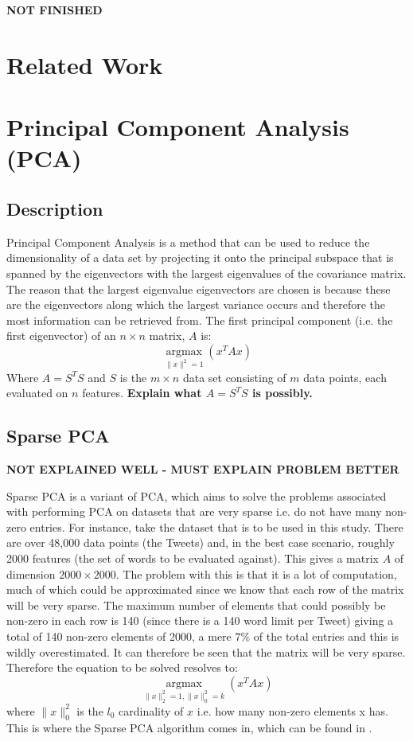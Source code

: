 \documentclass[11pt,a4paper]{article}
\begin{document}
\textbf{NOT FINISHED}

\section{Related Work}
\section{Principal Component Analysis (PCA)}
\subsection{Description}
Principal Component Analysis is a method that can be used to reduce the dimensionality of a data set by projecting it onto the principal subspace that is spanned by the eigenvectors with the largest eigenvalues of the covariance matrix. The reason that the largest eigenvalue eigenvectors are chosen is because these are the eigenvectors along which the largest variance occurs and therefore the most information can be retrieved from. The first principal component (i.e. the first eigenvector) of an $n\times n$ matrix, $A$ is:
\begin{equation}
\underset{\|x\|^2 = 1}{\operatorname{argmax}}\left( x^TAx\right)
\end{equation}
Where $A = S^TS$ and $S$ is the $m\times n$ data set consisting of $m$ data points, each evaluated on $n$ features. \textbf{Explain what $A = S^TS$ is possibly.}
\subsection{Sparse PCA}
\textbf{NOT EXPLAINED WELL - MUST EXPLAIN PROBLEM BETTER}

Sparse PCA is a variant of PCA, which aims to solve the problems associated with performing PCA on datasets that are very sparse i.e. do not have many non-zero entries. For instance, take the dataset that is to be used in this study. There are over 48,000 data points (the Tweets) and, in the best case scenario, roughly 2000 features (the set of words to be evaluated against). This gives a matrix $A$ of dimension $2000\times 2000$. The problem with this is that it is a lot of computation, much of which could be approximated since we know that each row of the matrix will be very sparse. The maximum number of elements that could possibly be non-zero in each row is 140 (since there is a 140 word limit per Tweet) giving a total of 140 non-zero elements of 2000, a mere $7\%$ of the total entries and this is wildly overestimated. It can therefore be seen that the matrix will be very sparse. Therefore the equation to be solved resolves to:
\begin{equation}
\underset{\|x\|_2^2 = 1, \|x\|_0^2 = k}{\operatorname{argmax}}\left( x^TAx\right)
\end{equation}
where $\|x\|_0^2$ is the $l_0$ cardinality of $x$ i.e. how many non-zero elements x has. This is where the Sparse PCA algorithm comes in, which can be found in \cite{dimakis}.
\end{document}
